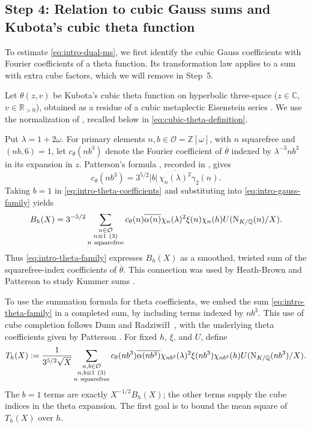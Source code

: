 \documentclass[11pt,a4paper]{article}
\numberwithin{equation}{section}
\numberwithin{figure}{section}
\theoremstyle{definition}
\theoremstyle{remark}
\newcommand{\Q}{\mathbb Q}
\newcommand{\R}{\mathbb R}
\newcommand{\NK}{\mathrm N_{K/\Q}}
\newcommand{\OO}{\mathcal O}
\begin{document}
\subsection{Step 4: \texorpdfstring{Relation}{Relation} to cubic Gauss sums and Kubota's cubic theta function}

To estimate \eqref{eq:intro-dual-ms}, we first identify the cubic
Gauss coefficients with Fourier coefficients of a theta function.
Its transformation law applies to a sum with extra cube factors,
which we will remove in Step~5.

Let $\theta(z,v)$ be Kubota's cubic theta function on hyperbolic three-space ($z\in\mathbb C$, $v \in \R_{>0}$), obtained as a residue of a cubic metaplectic Eisenstein series \cite{Kub69,Pat77}. We use the normalization of \cite[\S5.1, (5.6)--(5.8)]{DR},
recalled below in \eqref{eq:cubic-theta-definition}.

Put $\lambda=1+2\omega$. For primary elements $n,b\in\OO=\mathbb Z[\omega]$, 
with $n$ squarefree and $(nb,6)=1$, let $c_\theta(nb^3)$ denote the Fourier coefficient of $\overline\theta$ indexed by $\lambda^{-3}nb^3$ in its expansion in $z$. Patterson's formula \cite[Theorem~8.1]{Pat77}, recorded in \cite[(5.7)]{DR}, gives
\begin{equation}\label{eq:intro-theta-coefficients}
 c_\theta(nb^3)
     =3^{5/2}|b|\,\overline{\chi_n(\lambda)^2}\gamma_2(n).
\end{equation}
Taking $b=1$ in \eqref{eq:intro-theta-coefficients} and substituting into \eqref{eq:intro-gauss-family} yields
\begin{equation}\label{eq:intro-theta-family}
 B_h(X)=3^{-5/2}\sum_{\substack{n\in\OO\\n\equiv1\ (3)\\n\ {\rm squarefree}}}
 c_\theta(n)\overline{\alpha(n)}\chi_n(\lambda)^2
 \xi(n)\chi_n(h)U(\NK(n)/X).
\end{equation}
Thus \eqref{eq:intro-theta-family} expresses $B_h(X)$ as a smoothed, twisted sum of the squarefree-index coefficients of $\overline\theta$. This connection was used by Heath-Brown and Patterson to study Kummer sums \cite{HBP79}.

To use the summation formula for theta coefficients, we embed the sum \eqref{eq:intro-theta-family} in a completed sum, by including terms indexed by $nb^3$. This use of cube completion follows Dunn and Radziwi\l\l\ \cite[Lemma~5.4 and Proposition~5.3]{DR}, with the underlying theta coefficients given by Patterson \cite[Theorem~8.1]{Pat77}. For fixed $h$, $\xi$, and $U$, define
\begin{equation}\label{eq:intro-completed-theta-sum}
T_h(X):=\frac{1}{3^{5/2}\sqrt X}
 \sum_{\substack{n,b\in\OO\\n,b\equiv1\ (3)\\n\ {\rm squarefree}}}
 c_\theta(nb^3)\overline{\alpha(nb^3)}\chi_{nb^3}(\lambda)^2
 \xi(nb^3)\chi_{nb^3}(h)U(\NK(nb^3)/X).
\end{equation}
The $b=1$ terms are exactly $X^{-1/2}B_h(X)$; the other
terms supply the cube indices in the theta expansion. The first goal is to bound the mean square of $T_h(X)$ over $h$.
\end{document}
